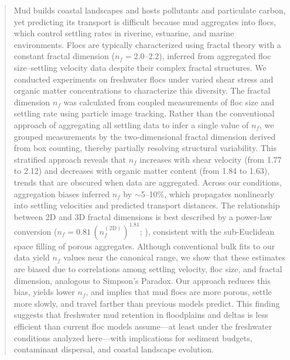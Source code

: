 \documentclass{agujournal2019}
\begin{document}
\begin{abstract}
Mud builds coastal landscapes and hosts pollutants and particulate carbon, yet predicting its transport is difficult because mud aggregates into flocs, which control settling rates in riverine, estuarine, and marine environments. Flocs are typically characterized using fractal theory with a constant fractal dimension ($n_f = 2.0$--$2.2$), inferred from aggregated floc size--settling velocity data despite their complex fractal structures. We conducted experiments on freshwater flocs under varied shear stress and organic matter concentrations to characterize this diversity. The fractal dimension $n_f$ was calculated from coupled measurements of floc size and settling rate using particle image tracking. Rather than the conventional approach of aggregating all settling data to infer a single value of $n_f$, we grouped measurements by the two-dimensional fractal dimension derived from box counting, thereby partially resolving structural variability. This stratified approach reveals that $n_f$ increases with shear velocity (from 1.77 to 2.12) and decreases with organic matter content (from 1.84 to 1.63), trends that are obscured when data are aggregated. Across our conditions, aggregation biases inferred $n_f$ by $\sim$5--10\%, which propagates nonlinearly into settling velocities and predicted transport distances. The relationship between 2D and 3D fractal dimensions is best described by a power-law conversion ($n_f = 0.81\,(n_f^{(2\mathrm{D})})^{1.81}$; ), consistent with the sub-Euclidean space filling of porous aggregates. Although conventional bulk fits to our data yield $n_f$ values near the canonical range, we show that these estimates are biased due to correlations among settling velocity, floc size, and fractal dimension, analogous to Simpson's Paradox. Our approach reduces this bias, yields lower $n_f$, and implies that mud flocs are more porous, settle more slowly, and travel farther than previous models predict. This finding suggests that freshwater mud retention in floodplains and deltas is less efficient than current floc models assume---at least under the freshwater conditions analyzed here---with implications for sediment budgets, contaminant dispersal, and coastal landscape evolution.


\end{abstract}
\end{document}
